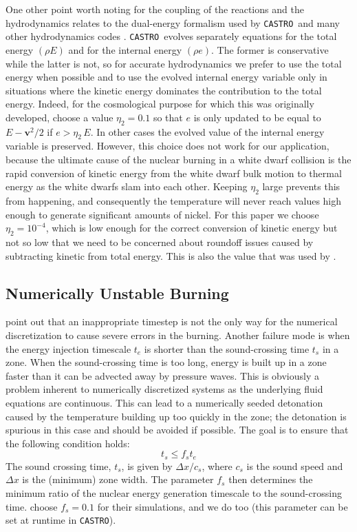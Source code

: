 \documentclass[twocolumn,numberedappendix]{../aastex6}
\newcommand{\castro}{\texttt{CASTRO}}
\begin{document}
One other point worth noting for the coupling of the reactions
and the hydrodynamics relates to the dual-energy formalism used
by \castro\ and many other hydrodynamics codes \cite{bryan:1995}.
\castro\ evolves separately equations for the total energy $(\rho E)$ and
for the internal energy $(\rho e)$. The former is conservative while the latter
is not, so for accurate hydrodynamics we prefer to use the total
energy when possible and to use the evolved internal energy variable
only in situations where the kinetic energy dominates the contribution
to the total energy. Indeed, for the cosmological purpose for which
this was originally developed, \cite{ENZO} choose a value $\eta_2 = 0.1$
so that $e$ is only updated to be equal to $E - \mathbf{v}^2/2$ if
$e > \eta_2\, E$. In other cases the evolved value of the internal
energy variable is preserved. However, this choice does not work
for our application, because the ultimate cause of the nuclear
burning in a white dwarf collision is the rapid conversion of
kinetic energy from the white dwarf bulk motion to thermal energy
as the white dwarfs slam into each other. Keeping $\eta_2$ large
prevents this from happening, and consequently the temperature
will never reach values high enough to generate significant
amounts of nickel. For this paper we choose $\eta_2 = 10^{-4}$,
which is low enough for the correct conversion of kinetic energy
but not so low that we need to be concerned about roundoff issues
caused by subtracting kinetic from total energy. This is also
the value that was used by \cite{hawley:2012}.

\subsection{Numerically Unstable Burning}
\label{sec:unstable_burning}

\citet{kushnir:2013} point out that an inappropriate timestep is 
not the only way for the numerical discretization to cause 
severe errors in the burning. Another failure mode is when
the energy injection timescale
$t_e$ is shorter than the sound-crossing time $t_s$ in a zone.
When the sound-crossing time is too long, energy is built up in
a zone faster than it can be advected away by pressure waves.
This is obviously a problem inherent to numerically discretized
systems as the underlying fluid equations are continuous.
This can lead to a numerically seeded detonation caused by the
temperature building up too quickly in the zone; the detonation
is spurious in this case and should be avoided if possible.
The goal is to ensure that the following condition holds:
\begin{equation}
  t_s \leq f_{s} t_e \label{eq:burning_limiter_2}
\end{equation}
The sound crossing time, $t_s$, is given by $\Delta x / c_s$, 
where $c_s$ is the sound speed and $\Delta x$ is the (minimum) 
zone width. The parameter $f_{s}$ then determines the minimum
ratio of the nuclear energy generation timescale to the 
sound-crossing time. \citet{kushnir:2013} choose $f_{s} = 0.1$ 
for their simulations, and we do too (this parameter can be set 
at runtime in \castro).
\end{document}
